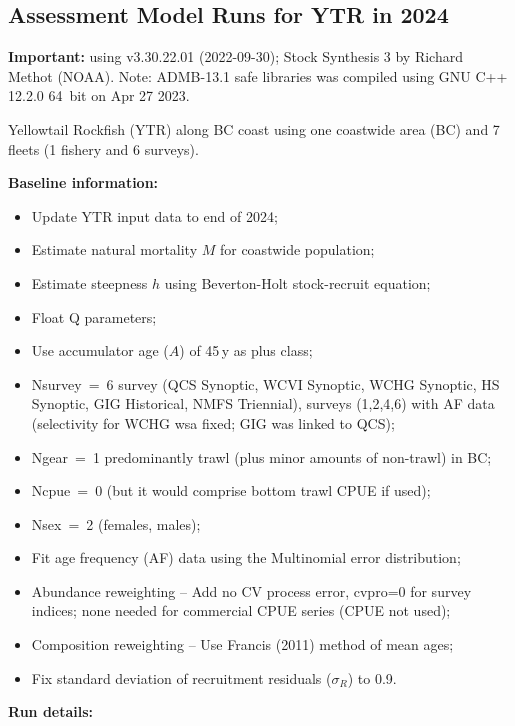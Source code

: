 
\subsection{Assessment Model Runs for YTR in 2024}

\textbf{Important:} using v3.30.22.01 (2022-09-30); Stock Synthesis 3 by Richard Methot (NOAA).
Note: ADMB-13.1 safe libraries was compiled using GNU C++ 12.2.0 64~bit on Apr 27 2023.

Yellowtail Rockfish (YTR) along BC coast using one coastwide area (BC) and 7 fleets (1 fishery and 6 surveys).

\textbf{Baseline information:}
\begin{itemize}
  \item Update YTR input data to end of 2024;
  \item Estimate natural mortality $M$ for coastwide population;
  \item Estimate steepness $h$ using Beverton-Holt stock-recruit equation;
  \item Float Q parameters;
  \item Use accumulator age ($A$) of 45\,y as plus class;
  \item Nsurvey~=~6 survey (QCS Synoptic, WCVI Synoptic, WCHG Synoptic, HS Synoptic, GIG Historical, NMFS Triennial),
        surveys (1,2,4,6) with AF data (selectivity for WCHG wsa fixed; GIG was linked to QCS);
  \item Ngear~=~1 predominantly trawl (plus minor amounts of non-trawl) in BC;
  \item Ncpue~=~0 (but it would comprise bottom trawl CPUE if used);
  \item Nsex~=~2 (females, males);
  \item Fit age frequency (AF) data using the Multinomial error distribution;
  \item Abundance reweighting -- Add no CV process error, cvpro=0 for survey indices; none needed for commercial CPUE series (CPUE not used);
  \item Composition reweighting -- Use Francis (2011) method of mean ages;
  \item Fix standard deviation of recruitment residuals ($\sigma_R$) to 0.9.
\end{itemize}

\textbf{Run details:}

